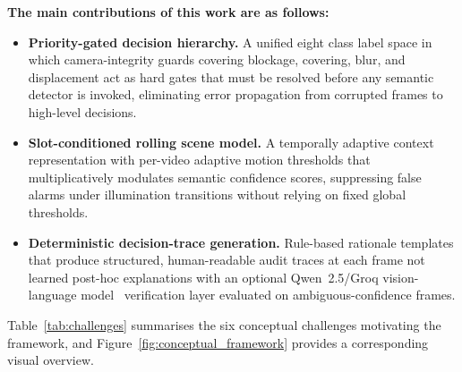 \documentclass[sensors,article,submit,pdftex,moreauthors]{Definitions/mdpi}
\begin{document}
\noindent\textbf{The main contributions of this work are as follows:}
 
\begin{itemize}
 
\item \textbf{Priority-gated decision hierarchy.} A unified eight class label space in which camera-integrity guards covering blockage, covering, blur, and displacement act as hard gates that must be resolved before any semantic detector is invoked, eliminating error propagation from corrupted frames to high-level decisions.
 
\item \textbf{Slot-conditioned rolling scene model.} A temporally adaptive context representation with per-video adaptive motion thresholds that multiplicatively modulates semantic confidence scores, suppressing false alarms under illumination transitions without relying on fixed global thresholds.
 
\item \textbf{Deterministic decision-trace generation.} Rule-based rationale templates that produce structured, human-readable audit traces at each frame not learned post-hoc explanations with an optional Qwen~2.5/Groq vision-language model~\cite{qwen25vl2025,groqapi2025} verification layer evaluated on ambiguous-confidence frames.
 
\end{itemize}
 
Table~\ref{tab:challenges} summarises the six conceptual challenges motivating the framework, and Figure~\ref{fig:conceptual_framework} provides a corresponding visual overview.
 
\end{document}
